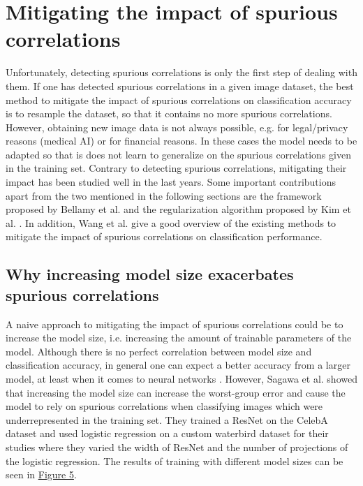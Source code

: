\documentclass{article}
\begin{document}
\section{Mitigating the impact of spurious correlations}
Unfortunately, detecting spurious correlations is only the first step of dealing with them. If one has detected spurious correlations in a given image dataset, the best method to mitigate the impact of spurious correlations on classification accuracy is to resample the dataset, so that it contains no more spurious correlations. However, obtaining new image data is not always possible, e.g. for legal/privacy reasons (medical AI) or for financial reasons. In these cases the model needs to be adapted so that is does not learn to generalize on the spurious correlations given in the training set. Contrary to detecting spurious correlations, mitigating their impact has been studied well in the last years. Some important contributions apart from the two mentioned in the following sections are the framework proposed by Bellamy et al. \cite{bellamy2018ai} and the regularization algorithm proposed by Kim et al. \cite{Kim_2019_CVPR}. In addition, Wang et al. \cite{Wang_2020_CVPR} give a good overview of the existing methods to mitigate the impact of spurious correlations on classification performance.

\subsection{Why increasing model size exacerbates spurious correlations}
A naive approach to mitigating the impact of spurious correlations could be to increase the model size, i.e. increasing the amount of trainable parameters of the model. Although there is no perfect correlation between model size and classification accuracy, in general one can expect a better accuracy from a larger model, at least when it comes to neural networks \cite{8395231}. However, Sagawa et al. \cite{pmlr-v119-sagawa20a} showed that increasing the model size can increase the worst-group error and cause the model to rely on spurious correlations when classifying images which were underrepresented in the training set. They trained a ResNet \cite{He_2016_CVPR} on the CelebA dataset \cite{liu2015faceattributes} and used logistic regression on a custom waterbird dataset for their studies where they varied the width of ResNet and the number of projections of the logistic regression. The results of training with different model sizes can be seen in \hyperref[fig:sagawaImg]{Figure 5}.
\end{document}
